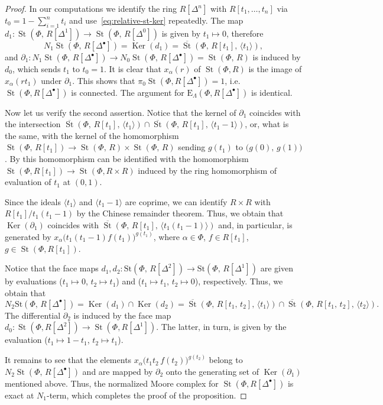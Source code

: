 \documentclass[oneside, 11pt]{amsart}
\numberwithin{equation}{section}
\newcommand{\Ker}{\mathop{\mathrm{Ker}}\nolimits}
\newcommand{\St}{\mathop{\mathrm{St}}\nolimits}
\newcommand{\E}{\mathrm{E}}
\theoremstyle{definition}
\theoremstyle{definition}
\theoremstyle{remark}
\begin{document}
\begin{proof}
In our computations we identify the ring $R[\Delta^n]$ with $R[t_1, \ldots, t_n]$ via $t_0 = 1 - \sum_{i=1}^n t_i$ and use~\eqref{eq:relative-st-ker} repeatedly.
The map $d_1\colon\St(\Phi,\,R[\Delta^1])\rightarrow\St(\Phi,\,R[\Delta^0])$ is given by $t_1\mapsto0$, therefore \[N_1\St(\Phi,\,R[\Delta^\bullet])=\Ker(d_1)=\overline{\St}(\Phi,\,R[t_1],\,\langle t_1\rangle),\]
and $\partial_1\colon N_1\St(\Phi,\,R[\Delta^\bullet])\rightarrow N_0\St(\Phi,\,R[\Delta^\bullet])=\St(\Phi,\,R)$ is induced by $d_0$, which sends $t_1$ to $t_0=1$. 
It is clear that $x_\alpha(r)$ of $\St(\Phi, R)$ is the image of $x_\alpha(rt_1)$ under $\partial_1$.
This shows that $\pi_0\St(\Phi, R[\Delta^\bullet])=1$, i.e. $\St(\Phi, R[\Delta^\bullet])$ is connected. The argument for $\E_\Lambda(\Phi, R[\Delta^\bullet])$ is identical.

Now let us verify the second assertion. Notice that the kernel of $\partial_1$ coincides with the intersection $\overline{\St}(\Phi,\,R[t_1],\,\langle t_1\rangle)\cap\overline{\St}(\Phi,\,R[t_1],\,\langle t_1-1 \rangle )$, or, what is the same, with the kernel of the homomorphism
$\St(\Phi,\,R[t_1])\rightarrow\St(\Phi,\,R)\times\St(\Phi,\,R)$
sending $g(t_1)$ to $\big(g(0),\,g(1)\big)$. By \cite[Lemma~2.12]{St73} this homomorphism can be identified with the homomorphism $\St(\Phi, R[t_1]) \to \St(\Phi, R\times R)$ induced by the ring homomorphism of evaluation of $t_1$ at $(0, 1)$.

Since the ideals $\langle t_1 \rangle$ and $\langle t_1-1 \rangle$ are coprime, we can identify $R\times R$ with $R[t_1]/t_1(t_1-1)$ by the Chinese remainder theorem. Thus, we obtain that $\Ker(\partial_1)$ coincides with $\overline{\St}(\Phi,\,R[t_1],\,\langle t_1(t_1-1) \rangle)$ and, in particular, is generated by $x_\alpha\big(t_1(t_1-1)f(t_1)\big)^{g(t_1)}$, where $\alpha \in \Phi$, $f\in R[t_1]$, $g \in \St(\Phi, R[t_1])$.

Notice that the face maps $d_1, d_2\colon\mathrm{St}(\Phi,\,R[\Delta^2])\rightarrow\mathrm{St}(\Phi,\,R[\Delta^1])$ are given by evaluations ($t_1\mapsto0$, $t_2\mapsto t_1$) and ($t_1\mapsto t_1$, $t_2\mapsto0$), respectively. Thus, we obtain that \[N_2\mathrm{St}(\Phi,\,R[\Delta^\bullet])=\Ker(d_1)\cap\Ker(d_2)=\overline{\St}(\Phi,\,R[t_1,\,t_2],\,\langle t_1\rangle )\cap\overline{\St}(\Phi,\,R[t_1,\,t_2],\,\langle t_2\rangle).\]
The differential $\partial_2$ is induced by the face map $d_0 \colon \St(\Phi, R[\Delta^2]) \to \St(\Phi, R[\Delta^1])$. The latter, in turn, is given by the evaluation ($t_1 \mapsto 1-t_1$, $t_2 \mapsto t_1$).

It remains to see that the elements $x_{\alpha}\big(t_1t_2\,f(t_2)\big)^{g(t_2)}$ belong to $N_2\St(\Phi,\,R[\Delta^\bullet])$ and are mapped by $\partial_2$ onto the generating set of $\Ker(\partial_1)$ mentioned above. Thus, the normalized Moore complex for $\St(\Phi, R[\Delta^\bullet])$ is exact at $N_1$-term, which completes the proof of the proposition. \end{proof}
\end{document}
